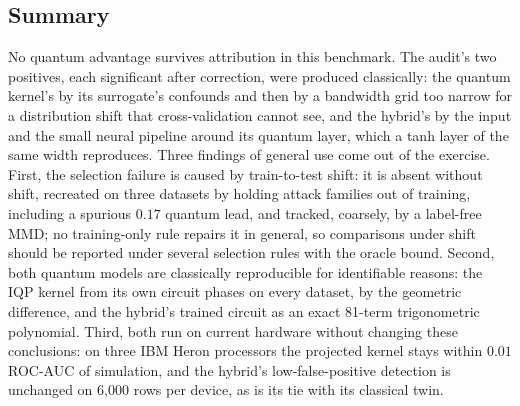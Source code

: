 \subsection{Summary}\label{sec:ksum}
No quantum advantage survives attribution in this benchmark. The audit's two positives, each significant
after correction, were produced classically: the quantum kernel's by its surrogate's confounds and then by
a bandwidth grid too narrow for a distribution shift that cross-validation cannot see, and the hybrid's by
the input and the small neural pipeline around its quantum layer, which a tanh layer of the same width
reproduces. Three findings of general use come out of the exercise. First, the selection failure is
caused by train-to-test shift: it is absent without shift, recreated on three datasets by holding attack
families out of training, including a spurious $0.17$ quantum lead, and tracked, coarsely, by a
label-free MMD; no training-only rule repairs it in general, so comparisons under shift should be
reported under several selection rules with the oracle bound. Second, both quantum models are classically
reproducible for identifiable reasons: the IQP kernel from its own circuit phases on every dataset, by the
geometric difference, and the hybrid's trained circuit as an exact 81-term trigonometric polynomial.
Third, both run on current hardware without changing these conclusions: on three IBM Heron processors the
projected kernel stays within $0.01$ ROC-AUC of simulation, and the hybrid's low-false-positive detection
is unchanged on 6{,}000 rows per device, as is its tie with its classical twin.
